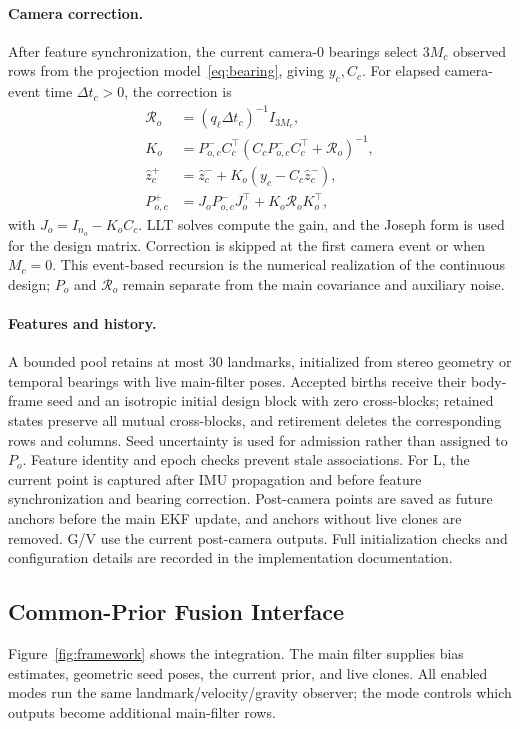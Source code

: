 \documentclass[a4paper,runningheads,twocolumn]{llncs}
\begin{document}
\paragraph{Camera correction.}
After feature synchronization, the current camera-0 bearings select $3M_c$ observed rows from the projection model~\eqref{eq:bearing}, giving $y_c,C_c$. For elapsed camera-event time $\Delta t_c>0$, the correction is
\begin{equation}
 \begin{aligned}
 \mathcal R_o&=(q_\ell\Delta t_c)^{-1}I_{3M_c},\\
 K_o&=P_{o,c}^-C_c^\top
       (C_cP_{o,c}^-C_c^\top+\mathcal R_o)^{-1},\\
 \hat z_c^+&=\hat z_c^-+K_o(y_c-C_c\hat z_c^-),\\
 P_{o,c}^+&=J_oP_{o,c}^-J_o^\top+K_o\mathcal R_oK_o^\top,
 \end{aligned}
 \label{eq:discretecorrect}
\end{equation}
with $J_o=I_{n_o}-K_oC_c$. LLT solves compute the gain, and the Joseph form is used for the design matrix. Correction is skipped at the first camera event or when $M_c=0$. This event-based recursion is the numerical realization of the continuous design; $P_o$ and $\mathcal R_o$ remain separate from the main covariance and auxiliary noise.

\paragraph{Features and history.}
A bounded pool retains at most 30 landmarks, initialized from stereo geometry or temporal bearings with live main-filter poses. Accepted births receive their body-frame seed and an isotropic initial design block with zero cross-blocks; retained states preserve all mutual cross-blocks, and retirement deletes the corresponding rows and columns. Seed uncertainty is used for admission rather than assigned to $P_o$. Feature identity and epoch checks prevent stale associations. For L, the current point is captured after IMU propagation and before feature synchronization and bearing correction. Post-camera points are saved as future anchors before the main EKF update, and anchors without live clones are removed. G/V use the current post-camera outputs. Full initialization checks and configuration details are recorded in the implementation documentation.

\subsection{Common-Prior Fusion Interface}
Figure~\ref{fig:framework} shows the integration. The main filter supplies bias estimates, geometric seed poses, the current prior, and live clones. All enabled modes run the same landmark/velocity/gravity observer; the mode controls which outputs become additional main-filter rows.
\end{document}
